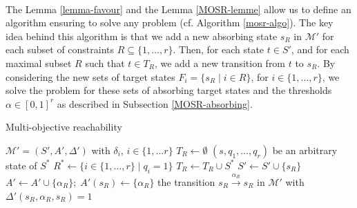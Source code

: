   $ $\\

The Lemma \ref{lemma-favour} and the Lemma \ref{MOSR-lemme} allow us to define an algorithm ensuring to solve any \MOSR{} problem (cf. Algorithm \ref{mosr-algo}). The key idea behind this algorithm is that we add a new absorbing state $s_R$ in $\mathcal{M'}$ for each subset of constraints $R \subseteq \{1, \dots, r\}$.
Then, for each state $t \in S'$, and for each maximal subset $R$ such that $t \in T_R$, we add a new transition from $t$ to $s_R$.
By considering the new sets of target states $F_i = \{ s_R \; | \; i \in R\}$, for $i \in \{1, \dots, r\}$,
we solve the \MOSR{} problem for these sets of absorbing target states and the thresholds $\alpha \in [0,1]^r$ as described in Subsection \ref{MOSR-absorbing}.

\begin{algorithm}[h!]
\caption{Multi-objective reachability}\label{mosr-algo}
\begin{algorithmic}[1]
 $\mathcal{M}'=(S', A', \Delta')$ with $\delta_i$, ${i \in \{1, \dots r\}}$
  \STATE $T_R \leftarrow \emptyset$
\ENDFOR
{}
   $(s, q_1, \dots, q_r)$ be an arbitrary state of $S^*$
  \STATE $R^* \leftarrow \{ i \in \{1, \dots, r\} \; | \; q_i = 1 \}$
    \STATE $T_R \leftarrow T_R \cup S^*$
  \ENDFOR
\ENDFOR
{}
  \STATE $S' \leftarrow S' \cup \{s_R\}$
  \STATE $A' \leftarrow A' \cup \{\alpha_R\} ; \; A'(s_R) \leftarrow \{\alpha_R\}$
   the transition $s_R \xrightarrow{\alpha_R}s_R$ in $\mathcal{M'}$ with $\Delta'(s_R, \alpha_R, s_R) = 1$
\ENDFOR

\end{algorithmic}
\end{algorithm}
